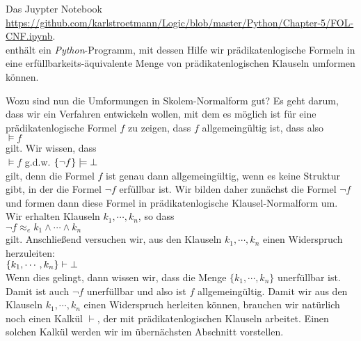 \noindent
Das Juypter Notebook
\\[0.2cm]
\hspace*{0.0cm}
\href{https://github.com/karlstroetmann/Logic/blob/master/Python/Chapter-5/FOL-CNF.ipynb}{https://github.com/karlstroetmann/Logic/blob/master/Python/Chapter-5/FOL-CNF.ipynb}.
\\[0.2cm]
enthält ein \textsl{Python}-Programm, mit dessen Hilfe wir prädikatenlogische Formeln in eine \linebreak
erfüllbarkeits-äquivalente Menge von prädikatenlogischen Klauseln umformen können.

Wozu sind nun die Umformungen in Skolem-Normalform gut?  Es geht darum, dass wir 
ein Verfahren entwickeln wollen, mit dem es möglich ist für eine prädikatenlogische Formel
$f$ zu zeigen, dass $f$ allgemeingültig ist, dass also \\[0.2cm]
\hspace*{1.3cm} $\models f$ \\[0.2cm]
gilt.  Wir wissen, dass \\[0.2cm]
\hspace*{1.3cm} $\models f$ \quad g.d.w. \quad $\{\neg f\} \models \bot$ \\[0.2cm]
gilt, denn die Formel $f$ ist genau dann allgemeingültig, wenn es keine Struktur gibt, in
der die Formel $\neg f$ erfüllbar ist. 
 Wir bilden daher zunächst die Formel $\neg f$ und formen dann diese Formel in prädikatenlogische
Klausel-Normalform um.  Wir erhalten Klauseln $k_1, \cdots, k_n$, so dass  \\[0.2cm]
\hspace*{1.3cm} $\neg f \approx_e k_1 \wedge \cdots \wedge k_n$ \\[0.2cm]
gilt.  Anschließend versuchen wir,
aus den Klauseln $k_1,\cdots,k_n$ einen Widerspruch herzuleiten: \\[0.2cm]
\hspace*{1.3cm} $\{k_1, \cdots, k_n\} \vdash \bot$ \\[0.2cm]
Wenn dies gelingt, dann wissen wir, dass die Menge $\{k_1, \cdots, k_n\}$ unerfüllbar ist.
Damit ist auch $\neg f$ unerfüllbar und also ist $f$ allgemeingültig.
Damit wir aus den Klauseln $k_1,\cdots,k_n$ einen Widerspruch herleiten können,
brauchen wir natürlich noch einen Kalkül $\vdash$, der mit prädikatenlogischen Klauseln arbeitet. 
Einen solchen Kalkül werden wir im übernächsten Abschnitt vorstellen.

